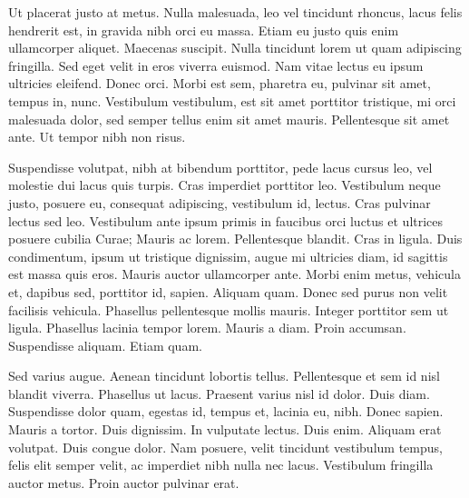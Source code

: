 Ut placerat justo at metus. Nulla malesuada, leo vel tincidunt rhoncus, lacus felis hendrerit est, in gravida nibh orci eu massa. Etiam eu justo quis enim ullamcorper aliquet. Maecenas suscipit. Nulla tincidunt lorem ut quam adipiscing fringilla. Sed eget velit in eros viverra euismod. Nam vitae lectus eu ipsum ultricies eleifend. Donec orci. Morbi est sem, pharetra eu, pulvinar sit amet, tempus in, nunc. Vestibulum vestibulum, est sit amet porttitor tristique, mi orci malesuada dolor, sed semper tellus enim sit amet mauris. Pellentesque sit amet ante. Ut tempor nibh non risus.

Suspendisse volutpat, nibh at bibendum porttitor, pede lacus cursus leo, vel molestie dui lacus quis turpis. Cras imperdiet porttitor leo. Vestibulum neque justo, posuere eu, consequat adipiscing, vestibulum id, lectus. Cras pulvinar lectus sed leo. Vestibulum ante ipsum primis in faucibus orci luctus et ultrices posuere cubilia Curae; Mauris ac lorem. Pellentesque blandit. Cras in ligula. Duis condimentum, ipsum ut tristique dignissim, augue mi ultricies diam, id sagittis est massa quis eros. Mauris auctor ullamcorper ante. Morbi enim metus, vehicula et, dapibus sed, porttitor id, sapien. Aliquam quam. Donec sed purus non velit facilisis vehicula. Phasellus pellentesque mollis mauris. Integer porttitor sem ut ligula. Phasellus lacinia tempor lorem. Mauris a diam. Proin accumsan. Suspendisse aliquam. Etiam quam.

Sed varius augue. Aenean tincidunt lobortis tellus. Pellentesque et sem id nisl blandit viverra. Phasellus ut lacus. Praesent varius nisl id dolor. Duis diam. Suspendisse dolor quam, egestas id, tempus et, lacinia eu, nibh. Donec sapien. Mauris a tortor. Duis dignissim. In vulputate lectus. Duis enim. Aliquam erat volutpat. Duis congue dolor. Nam posuere, velit tincidunt vestibulum tempus, felis elit semper velit, ac imperdiet nibh nulla nec lacus. Vestibulum fringilla auctor metus. Proin auctor pulvinar erat.